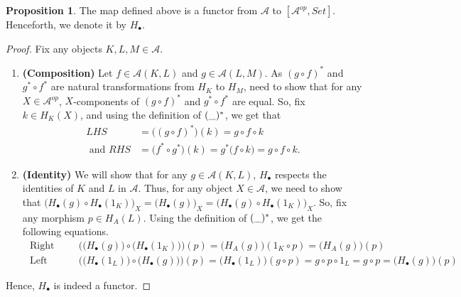 \documentclass[18pt,a4paper]{article}
\theoremstyle{definition}
\newtheorem{proop}[theorem]{Proposition}
\begin{document}
	\begin{proop} The map defined above is a functor from $\mathcal{A}$ to $[\mathcal{A} ^{op},Set]$.
		Henceforth, we denote it by $H_\bullet$.
	\end{proop}
	\begin{proof}\setcounter{equation}{0}
		Fix any objects $K,L,M \in \mathcal{A} $.
		\begin{enumerate}[label=\Roman*]
			\item \textbf{ (Composition) }
				Let $f \in \mathcal{A} (K,L)$ and $g \in \mathcal{A} (L,M)$.
				As $(g \circ f)^*$ and $g^* \circ f^* $ are natural transformations from
				$H_K$ to $H_M$, need to show that for any $X\in \mathcal{A} ^{op}$, $X$-components
				of $(g \circ f)^*$ and $g^* \circ f^* $ are equal. So, fix $k \in H_K(X)$,
				and using the definition of $(\string _)^*$, we get that
				\begin{align*}
					LHS&=\Big( (g \circ f)^* \Big) (k)=g\circ f \circ k \\
					\text{ and } RHS&=\Big( f^* \circ g^* \Big) (k)=g^* \big(f \circ k\big)
				=g\circ f \circ k. \end{align*}
			\item \textbf{ (Identity) } We will show that for any $g \in \mathcal{A} (K,L)$, $H_\bullet$
				respects the identities	of $K$ and $L$ in $\mathcal{A}$.
				Thus, for any object $X \in \mathcal{A} $, we need to show that
				$\Big( H_\bullet(g) \circ H_\bullet(1_K) \Big)_X = \Big( H_\bullet(g)\Big) _X
				=\Big( H_\bullet(g) \circ H_\bullet(1_K) \Big)_X $. So, fix any morphism $p \in H_A(L)$.
				Using the definition of $(\string _)^*$, we get the following equations.
				\begin{align*}
					\text{ Right Identity: }& \Big( \big( H_\bullet(g) \big) \circ \big( H_\bullet(1_K)
					\big) \Big)(p)
					=\big( H_A(g) \big) (1_K \circ p) =
					\big( H_A(g) \big) (p) \\
							\text{ Left Identity: }& \Big( \big( H_\bullet(1_L) \big) \circ \big( H_\bullet(g)\big) \Big)(p)
							=\big( H_\bullet(1_L) \big) (g \circ p) = g \circ p \circ 1_L=g \circ p
							= \big( H_\bullet(g) \big)(p)
						\end{align*}

			\end{enumerate}
			Hence, $H_\bullet$ is indeed a functor.
		\end{proof}
\end{document}
